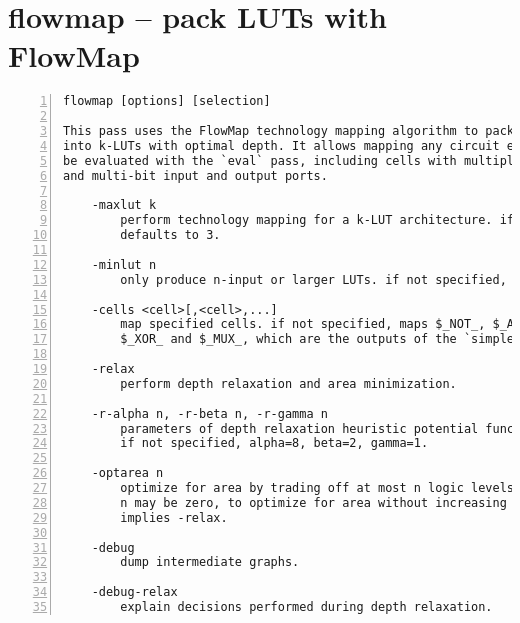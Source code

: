 \section{flowmap -- pack LUTs with FlowMap}
\label{cmd:flowmap}
\begin{lstlisting}[numbers=left,frame=single]
    flowmap [options] [selection]

This pass uses the FlowMap technology mapping algorithm to pack logic gates
into k-LUTs with optimal depth. It allows mapping any circuit elements that can
be evaluated with the `eval` pass, including cells with multiple output ports
and multi-bit input and output ports.

    -maxlut k
        perform technology mapping for a k-LUT architecture. if not specified,
        defaults to 3.

    -minlut n
        only produce n-input or larger LUTs. if not specified, defaults to 1.

    -cells <cell>[,<cell>,...]
        map specified cells. if not specified, maps $_NOT_, $_AND_, $_OR_,
        $_XOR_ and $_MUX_, which are the outputs of the `simplemap` pass.

    -relax
        perform depth relaxation and area minimization.

    -r-alpha n, -r-beta n, -r-gamma n
        parameters of depth relaxation heuristic potential function.
        if not specified, alpha=8, beta=2, gamma=1.

    -optarea n
        optimize for area by trading off at most n logic levels for fewer LUTs.
        n may be zero, to optimize for area without increasing depth.
        implies -relax.

    -debug
        dump intermediate graphs.

    -debug-relax
        explain decisions performed during depth relaxation.
\end{lstlisting}


